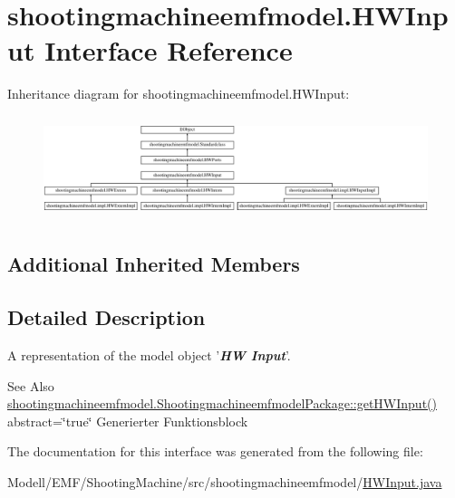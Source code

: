 \hypertarget{interfaceshootingmachineemfmodel_1_1_h_w_input}{\section{shootingmachineemfmodel.\-H\-W\-Input Interface Reference}
\label{interfaceshootingmachineemfmodel_1_1_h_w_input}
}
Inheritance diagram for shootingmachineemfmodel.\-H\-W\-Input\-:\begin{figure}[H]
\begin{center}
\leavevmode
\includegraphics[height=3.054545cm]{interfaceshootingmachineemfmodel_1_1_h_w_input}
\end{center}
\end{figure}
\subsection*{Additional Inherited Members}


\subsection{Detailed Description}
A representation of the model object '{\itshape {\bfseries H\-W Input}}'.

\begin{DoxySeeAlso}{See Also}
\hyperlink{interfaceshootingmachineemfmodel_1_1_shootingmachineemfmodel_package_a300f22d97187e71008e38fcdc44814bc}{shootingmachineemfmodel.\-Shootingmachineemfmodel\-Package\-::get\-H\-W\-Input()}  abstract=\char`\"{}true\char`\"{} Generierter Funktionsblock 
\end{DoxySeeAlso}


The documentation for this interface was generated from the following file\-:\begin{DoxyCompactItemize}
\item 
Modell/\-E\-M\-F/\-Shooting\-Machine/src/shootingmachineemfmodel/\hyperlink{_h_w_input_8java}{H\-W\-Input.\-java}\end{DoxyCompactItemize}
